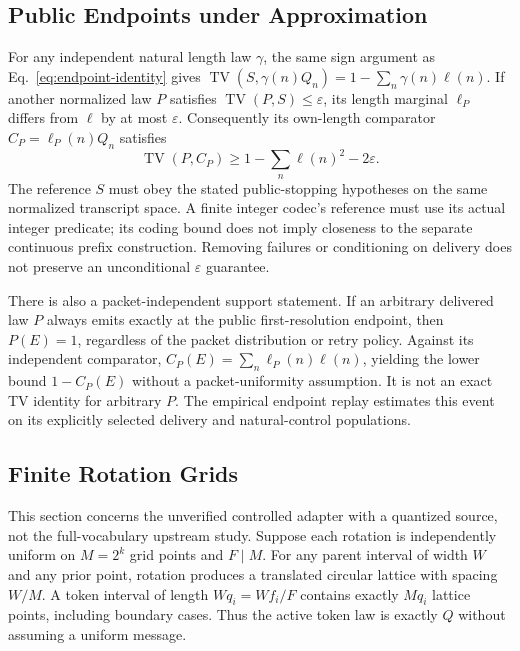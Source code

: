 \subsection{Public Endpoints under Approximation}

For any independent natural length law $\gamma$, the same sign argument as
Eq.~\eqref{eq:endpoint-identity} gives
$\operatorname{TV}(S,\gamma(n)Q_n)=1-\sum_n\gamma(n)\ell(n)$.
If another normalized law $P$ satisfies $\operatorname{TV}(P,S)\le\varepsilon$,
its length marginal $\ell_P$ differs from $\ell$ by at most $\varepsilon$.
Consequently its own-length comparator $C_P=\ell_P(n)Q_n$ satisfies
\begin{equation}
 \operatorname{TV}(P,C_P)\ge1-\sum_n\ell(n)^2-2\varepsilon.
 \label{eq:endpoint-approximation}
\end{equation}
The reference $S$ must obey the stated public-stopping hypotheses on the same
normalized transcript space. A finite integer codec's reference must use its
actual integer predicate; its coding bound does not imply closeness to the
separate continuous prefix construction. Removing failures or conditioning on
delivery does not preserve an unconditional $\varepsilon$ guarantee.

There is also a packet-independent support statement. If an arbitrary delivered
law $P$ always emits exactly at the public first-resolution endpoint, then
$P(E)=1$, regardless of the packet distribution or retry policy. Against its
independent comparator, $C_P(E)=\sum_n\ell_P(n)\ell(n)$, yielding the lower
bound $1-C_P(E)$ without a packet-uniformity assumption. It is not an exact TV
identity for arbitrary $P$. The empirical endpoint replay estimates this event
on its explicitly selected delivery and natural-control populations.

\subsection{Finite Rotation Grids}
\label{app:rotation-grid}

This section concerns the unverified controlled adapter with a quantized source,
not the full-vocabulary upstream study. Suppose each rotation is independently
uniform on $M=2^k$ grid points and $F\mid M$.
For any parent interval of width $W$ and any prior point, rotation produces a
translated circular lattice with spacing $W/M$. A token interval of length
$Wq_i=Wf_i/F$ contains exactly $Mq_i$ lattice points, including boundary cases.
Thus the active token law is exactly $Q$ without assuming a uniform message.

